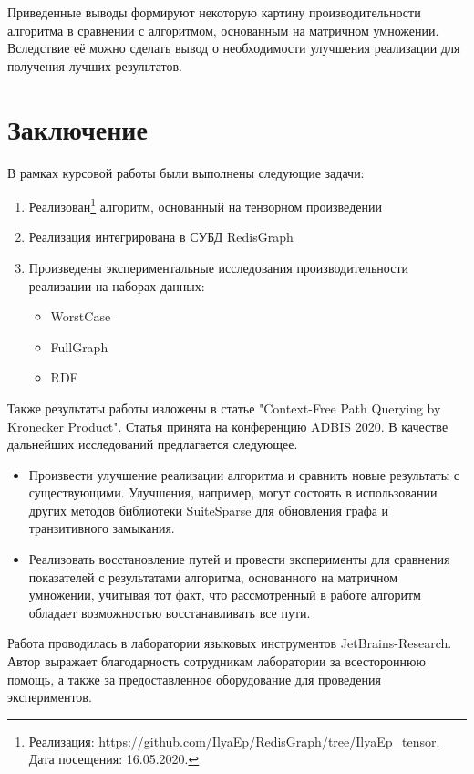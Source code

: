 \documentclass[14pt]{matmex-diploma}
\theoremstyle{definition}
\begin{document}
Приведенные выводы формируют некоторую картину производительности алгоритма в сравнении с алгоритмом, основанным на матричном умножении. Вследствие её можно сделать вывод о необходимости улучшения реализации для получения лучших результатов.

\section*{Заключение}
В рамках курсовой работы были выполнены следующие задачи:
\begin{enumerate}
    \item Реализован\footnote{Реализация: https://github.com/IlyaEp/RedisGraph/tree/IlyaEp\_tensor. Дата посещения: 16.05.2020.} алгоритм, основанный на тензорном произведении
        \item Реализация интегрирована в СУБД RedisGraph
        \item Произведены экспериментальные исследования производительности реализации на наборах данных:
        \begin{itemize}
            \item WorstCase
            \item FullGraph
            \item RDF
        \end{itemize}
\end{enumerate}
Также результаты работы изложены в статье "Context-Free Path Querying by Kronecker Product". Статья принята на конференцию ADBIS 2020.
В качестве дальнейших исследований предлагается следующее.
\begin{itemize}
    \item Произвести улучшение реализации алгоритма и сравнить новые результаты с существующими. Улучшения, например, могут состоять в использовании других методов библиотеки SuiteSparse для обновления графа и транзитивного замыкания.
    \item Реализовать восстановление путей и провести эксперименты для сравнения показателей с результатами алгоритма, основанного на матричном умножении, учитывая тот факт, что рассмотренный в работе алгоритм обладает возможностью восстанавливать все пути.
\end{itemize}

Работа проводилась в лаборатории языковых инструментов JetBrains-Research. Автор выражает благодарность сотрудникам лаборатории за всестороннюю помощь, а также за предоставленное оборудование для проведения экспериментов.

\setmonofont[Mapping=tex-text]{CMU Typewriter Text}


\end{document}
